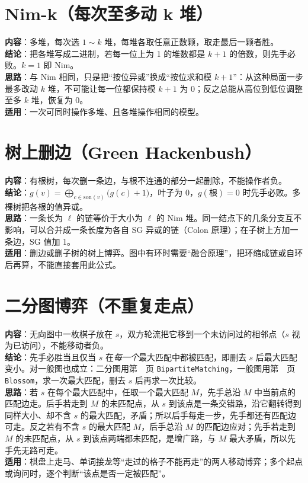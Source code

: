 \section{Nim-k（每次至多动 k 堆）}\label{knowledge-game-nim-k}
\textbf{内容}：多堆，每次选 $1\sim k$ 堆，每堆各取任意正数颗，取走最后一颗者胜。\\
\textbf{结论}：把各堆写成二进制，若每一位上为 1 的堆数都是 $k+1$ 的倍数，则先手必败。$k=1$ 即 Nim。\\
\textbf{思路}：与 Nim 相同，只是把“按位异或”换成“按位求和模 $k+1$”：从这种局面一步最多改动 $k$ 堆，不可能让每一位都保持模 $k+1$ 为 0；反之总能从高位到低位调整至多 $k$ 堆，恢复为 0。\\
\textbf{适用}：一次可同时操作多堆、且各堆操作相同的模型。

\section{树上删边（Green Hackenbush）}\label{knowledge-game-hackenbush}
\textbf{内容}：有根树，每次删一条边，与根不连通的部分一起删除，不能操作者负。\\
\textbf{结论}：$g(v)=\bigoplus_{c\in\mathrm{son}(v)}\bigl(g(c)+1\bigr)$，叶子为 $0$，$g(\text{根})=0$ 时先手必败。多棵树把各根的值异或。\\
\textbf{思路}：一条长为 $\ell$ 的链等价于大小为 $\ell$ 的 Nim 堆。同一结点下的几条分支互不影响，可以合并成一条长度为各自 SG 异或的链（Colon 原理）；在子树上方加一条边，SG 值加 1。\\
\textbf{适用}：删边或删子树的树上博弈。图中有环时需要“融合原理”，把环缩成链或自环后再算，不能直接套用此公式。

\section{二分图博弈（不重复走点）}\label{knowledge-game-matching}
\textbf{内容}：无向图中一枚棋子放在 $s$，双方轮流把它移到一个未访问过的相邻点（$s$ 视为已访问），不能移动者负。\\
\textbf{结论}：先手必胜当且仅当 $s$ 在\emph{每一个}最大匹配中都被匹配，即删去 $s$ 后最大匹配变小。对一般图也成立：二分图用第~\pageref{compact-BipartiteMatching}~页 \texttt{BipartiteMatching}，一般图用第~\pageref{compact-Blossom}~页 \texttt{Blossom}，求一次最大匹配，删去 $s$ 后再求一次比较。\\
\textbf{思路}：若 $s$ 在每个最大匹配中，任取一个最大匹配 $M$，先手总沿 $M$ 中当前点的匹配边走。后手若走到 $M$ 的未匹配点，从 $s$ 到该点是一条交错路，沿它翻转得到同样大小、却不含 $s$ 的最大匹配，矛盾；所以后手每走一步，先手都还有匹配边可走。反之若有不含 $s$ 的最大匹配 $M$，后手总沿 $M$ 的匹配边应对；先手若走到 $M$ 的未匹配点，从 $s$ 到该点两端都未匹配，是增广路，与 $M$ 最大矛盾，所以先手先无路可走。\\
\textbf{适用}：棋盘上走马、单词接龙等“走过的格子不能再走”的两人移动博弈；多个起点或询问时，逐个判断“该点是否一定被匹配”。

